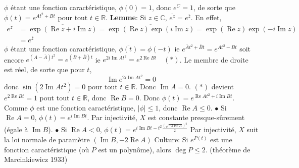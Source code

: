 \documentclass{report}
\DeclareMathOperator{\re}{Re}
\DeclareMathOperator{\im}{Im}
\begin{document}
\subsection{} \noindent{}\\ 
\\ 
\\
\noindent $\phi$ étant une fonction caractéristique, $\phi(0)=1$, donc $e^C=1$, de sorte que $\phi(t)=e^{At^2+Bt}$ pour tout $t\in \mathbb R$.\newline
\newline
\textbf{Lemme}: Si $z\in \mathbb C$, $\overline{e^{z}}=e^{\overline z}$.\newline
En effet, $$\begin{aligned} \overline{e^{z}}&= \overline{ \exp(\re z + i\im z) } = \overline{\exp(\re z)\exp(i\im z)}=\exp(\re z)\exp(-i\im z) \\
&= e^{\overline z}\end{aligned} $$
$\phi$ étant une fonction caractéristique, $\overline{\phi(t)} =\phi(-t)$ ie 
$e^{\overline At^2 + \overline Bt} = e^{At^2-Bt}$ soit encore $e^{(A-\overline A)t^2} = e^{(B+\overline B)t}$ ie $e^{2i\im A t^2}=  e^{2\re B t} \quad (*)$.\newline
Le membre de droite est réel, de sorte que pour $t$, $$\im e^{2i\im A t^2} = 0$$
donc $\sin(2\im A t^2)=0$ pour tout $t\in \mathbb R$.\newline
Donc $\im A=0$. $(*)$ devient $e^{2\re B t}=1$ pout tout $t\in \mathbb R$, donc $\re B=0$.\newline
\newline
Donc $\phi(t) = e^{\re At^2 + i\im Bt}$. Comme $\phi$ est une fonction caractéristique, $|\phi|\leq 1$, donc $\re A\leq 0$. \newline
\newline
$\bullet$ Si $\re A=0$, $\phi(t) = e^{i\im Bt}$. Par injectivité, $X$ est constante presque-sûrement (égale à $\im B$).\newline
$\bullet$ Si $\re A<0$, $\phi(t) = e^{i\im Bt -t^2 \frac{(\sqrt{-2\re A})^2}{2}}$\newline
Par injectivité, $X$ suit la loi normale de paramètre $(\im B, -2\re A)$\newline
\newline
Culture: Si $e^{P(t)}$ est une fonction caractéristique (où $P$ est un polynôme), alors $\deg P \leq 2$. (théorème de Marcinkiewicz 1933) 
\end{document}
